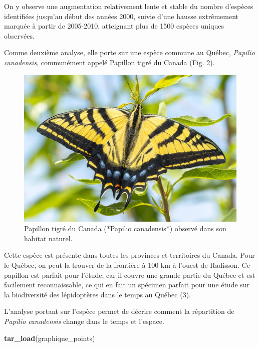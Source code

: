 \documentclass[9pt,twocolumn,twoside,]{pnas-new}
\newenvironment{Shaded}{\begin{snugshade}}{\end{snugshade}}
\newcommand{\FunctionTok}[1]{\textcolor[rgb]{0.13,0.29,0.53}{\textbf{#1}}}
\newcommand{\NormalTok}[1]{#1}
\begin{document}
On y observe une augmentation relativement lente et stable du nombre
d'espèces identifiées jusqu'au début des années 2000, suivie d'une
hausse extrêmement marquée à partir de 2005-2010, atteignant plus de
1500 espèces uniques observées.

Comme deuxième analyse, elle porte sur une espèce commune au Québec,
\emph{Papilio canadensis}, communément appelé Papillon tigré du Canada
(Fig. 2).

\begin{figure}

{\centering \includegraphics[width=0.8\linewidth]{Rapport/Papilio_canadensis} 

}

\caption{Papillon tigré du Canada (*Papilio canadensis*) observé dans son habitat naturel.}\label{fig:fig-papilio}
\end{figure}

Cette espèce est présente dans toutes les provinces et territoires du
Canada. Pour le Québec, on peut la trouver de la frontière à 100 km à
l'ouest de Radisson. Ce papillon est parfait pour l'étude, car il couvre
une grande partie du Québec et est facilement reconnaissable, ce qui en
fait un spécimen parfait pour une étude sur la biodiversité des
lépidoptères dans le temps au Québec (3).

L'analyse portant sur l'espèce permet de décrire comment la répartition
de \emph{Papilio canadensis} change dans le temps et l'espace.

\begin{Shaded}
\begin{Highlighting}[]
\FunctionTok{tar\_load}\NormalTok{(graphique\_points)}
\end{Highlighting}
\end{Shaded}
\end{document}
